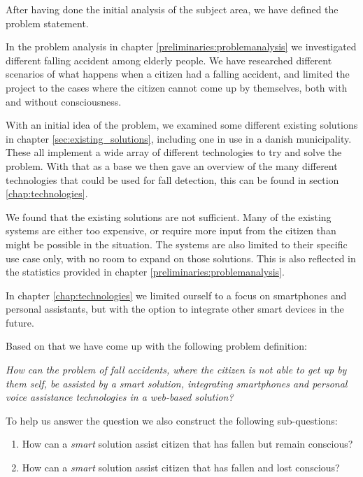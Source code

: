\label{problemdefinition}
After having done the initial analysis of the subject area, we have defined the problem statement.

In the problem analysis in chapter \ref{preliminaries:problemanalysis} we investigated different falling accident among elderly people. We have researched different scenarios of what happens when a citizen had a falling accident, and limited the project to the cases where the citizen cannot come up by themselves, both with and without consciousness.

With an initial idea of the problem, we examined some different existing solutions in chapter \ref{sec:existing_solutions}, including one in use in a danish municipality. These all implement a wide array of different technologies to try and solve the problem. With that as a base we then gave an overview of the many different technologies that could be used for fall detection, this can be found in section \ref{chap:technologies}.

We found that the existing solutions are not sufficient. Many of the existing systems are either too expensive, or require more input from the citizen than might be possible in the situation. The systems are also limited to their specific use case only, with no room to expand on those solutions. This is also reflected in the statistics provided in chapter \ref{preliminaries:problemanalysis}.

In chapter \ref{chap:technologies} we limited ourself to a focus on smartphones and personal assistants, but with the option to integrate other smart devices in the future.

Based on that we have come up with the following problem definition:

\textit{How can the problem of fall accidents, where the citizen is not able to get up by them self, be assisted by a smart solution, integrating smartphones and personal voice assistance technologies in a web-based solution?}

To help us answer the question we also construct the following sub-questions:
\begin{enumerate}
    \item How can a \textit{smart} solution assist citizen that has fallen but remain conscious?
    \item How can a \textit{smart} solution assist citizen that has fallen and lost conscious?
\end{enumerate}